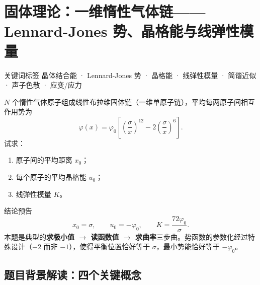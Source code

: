 \section{固体理论：一维惰性气体链——Lennard-Jones 势、晶格能与线弹性模量}
\label{sec:lj-chain}

\begin{tipbox}{关键词标签}
晶体结合能 · Lennard-Jones 势 · 晶格能 · 线弹性模量 · 简谐近似 · 声子色散 · 应变/应力
\end{tipbox}

\begin{modelbox}
$N$ 个惰性气体原子组成线性布拉维固体链（一维单原子链），平均每两原子间相互作用势为
\[
  \varphi(x) = \varphi_0 \left[ \left(\frac{\sigma}{x}\right)^{12} - 2\left(\frac{\sigma}{x}\right)^{6} \right].
\]
试求：
\begin{enumerate}[nosep]
  \item 原子间的平均距离 $x_0$；
  \item 每个原子的平均晶格能 $u_0$；
  \item 线弹性模量 $K$。
\end{enumerate}
\end{modelbox}

\vspace{0.3em}
\begin{insightbox}{结论预告}
\[
  x_0 = \sigma, \qquad u_0 = -\varphi_0, \qquad K = \frac{72\varphi_0}{\sigma}.
\]
本题是典型的\textbf{求极小值 $\to$ 读函数值 $\to$ 求曲率}三步曲。势函数的参数化经过特殊设计（$-2$ 而非 $-1$），使得平衡位置恰好等于 $\sigma$，最小势能恰好等于 $-\varphi_0$。
\end{insightbox}

\subsection{题目背景解读：四个关键概念}

